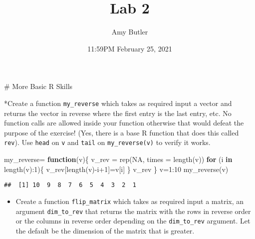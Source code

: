 \documentclass[
]{article}
\title{Lab 2}
\author{Amy Butler}
\date{11:59PM February 25, 2021}
\newenvironment{Shaded}{\begin{snugshade}}{\end{snugshade}}
\newcommand{\AttributeTok}[1]{\textcolor[rgb]{0.77,0.63,0.00}{#1}}
\newcommand{\ConstantTok}[1]{\textcolor[rgb]{0.00,0.00,0.00}{#1}}
\newcommand{\ControlFlowTok}[1]{\textcolor[rgb]{0.13,0.29,0.53}{\textbf{#1}}}
\newcommand{\DecValTok}[1]{\textcolor[rgb]{0.00,0.00,0.81}{#1}}
\newcommand{\FunctionTok}[1]{\textcolor[rgb]{0.00,0.00,0.00}{#1}}
\newcommand{\NormalTok}[1]{#1}
\newcommand{\OtherTok}[1]{\textcolor[rgb]{0.56,0.35,0.01}{#1}}
\newcommand{\SpecialCharTok}[1]{\textcolor[rgb]{0.00,0.00,0.00}{#1}}
\providecommand{\tightlist}{%
  \setlength{\itemsep}{0pt}\setlength{\parskip}{0pt}}
\begin{document}
\maketitle

\# More Basic R Skills

*Create a function \texttt{my\_reverse} which takes as required input a
vector and returns the vector in reverse where the first entry is the
last entry, etc. No function calls are allowed inside your function
otherwise that would defeat the purpose of the exercise! (Yes, there is
a base R function that does this called \texttt{rev}). Use \texttt{head}
on \texttt{v} and \texttt{tail} on \texttt{my\_reverse(v)} to verify it
works.

\begin{Shaded}
\begin{Highlighting}[]
\NormalTok{my\_reverse}\OtherTok{=} \ControlFlowTok{function}\NormalTok{(v)\{}
\NormalTok{  v\_rev }\OtherTok{=} \FunctionTok{rep}\NormalTok{(}\ConstantTok{NA}\NormalTok{, }\AttributeTok{times =} \FunctionTok{length}\NormalTok{(v))}
  \ControlFlowTok{for}\NormalTok{ (i }\ControlFlowTok{in} \FunctionTok{length}\NormalTok{(v)}\SpecialCharTok{:}\DecValTok{1}\NormalTok{)\{}
\NormalTok{    v\_rev[}\FunctionTok{length}\NormalTok{(v)}\SpecialCharTok{{-}}\NormalTok{i}\SpecialCharTok{+}\DecValTok{1}\NormalTok{]}\OtherTok{=}\NormalTok{v[i]}
\NormalTok{  \}}
\NormalTok{  v\_rev}
\NormalTok{\}}
\NormalTok{v}\OtherTok{=}\DecValTok{1}\SpecialCharTok{:}\DecValTok{10}
\FunctionTok{my\_reverse}\NormalTok{(v)}
\end{Highlighting}
\end{Shaded}

\begin{verbatim}
##  [1] 10  9  8  7  6  5  4  3  2  1
\end{verbatim}

\begin{itemize}
\tightlist
\item
  Create a function \texttt{flip\_matrix} which takes as required input
  a matrix, an argument \texttt{dim\_to\_rev} that returns the matrix
  with the rows in reverse order or the columns in reverse order
  depending on the \texttt{dim\_to\_rev} argument. Let the default be
  the dimension of the matrix that is greater.
\end{itemize}
\end{document}
